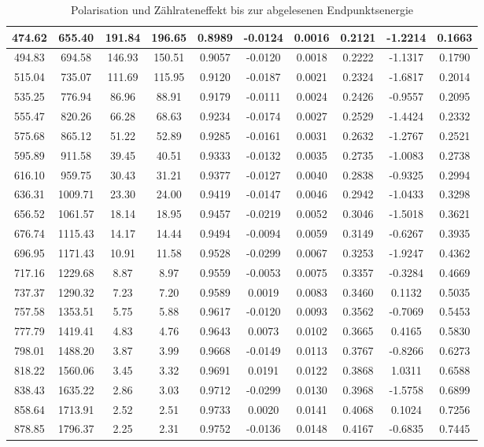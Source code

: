 \documentclass[twoside,colorback,accentcolor=tud4c,11pt]{tudreport}
\begin{document}
\begin{table}[H]
\begin{tabular}{|c|c|c|c|c|c|c|c|c|c|}
\hline
474.62 & 655.40 & 191.84 & 196.65 & 0.8989 & -0.0124 & 0.0016 & 0.2121 & -1.2214 & 0.1663 \\
\hline
494.83 & 694.58 & 146.93 & 150.51 & 0.9057 & -0.0120 & 0.0018 & 0.2222 & -1.1317 & 0.1790 \\
\hline
515.04 & 735.07 & 111.69 & 115.95 & 0.9120 & -0.0187 & 0.0021 & 0.2324 & -1.6817 & 0.2014 \\
\hline
535.25 & 776.94 & 86.96 & 88.91 & 0.9179 & -0.0111 & 0.0024 & 0.2426 & -0.9557 & 0.2095 \\
\hline
555.47 & 820.26 & 66.28 & 68.63 & 0.9234 & -0.0174 & 0.0027 & 0.2529 & -1.4424 & 0.2332 \\
\hline
575.68 & 865.12 & 51.22 & 52.89 & 0.9285 & -0.0161 & 0.0031 & 0.2632 & -1.2767 & 0.2521 \\
\hline
595.89 & 911.58 & 39.45 & 40.51 & 0.9333 & -0.0132 & 0.0035 & 0.2735 & -1.0083 & 0.2738 \\
\hline
616.10 & 959.75 & 30.43 & 31.21 & 0.9377 & -0.0127 & 0.0040 & 0.2838 & -0.9325 & 0.2994 \\
\hline
636.31 & 1009.71 & 23.30 & 24.00 & 0.9419 & -0.0147 & 0.0046 & 0.2942 & -1.0433 & 0.3298 \\
\hline
656.52 & 1061.57 & 18.14 & 18.95 & 0.9457 & -0.0219 & 0.0052 & 0.3046 & -1.5018 & 0.3621 \\
\hline
676.74 & 1115.43 & 14.17 & 14.44 & 0.9494 & -0.0094 & 0.0059 & 0.3149 & -0.6267 & 0.3935 \\
\hline
696.95 & 1171.43 & 10.91 & 11.58 & 0.9528 & -0.0299 & 0.0067 & 0.3253 & -1.9247 & 0.4362 \\
\hline
717.16 & 1229.68 & 8.87 & 8.97 & 0.9559 & -0.0053 & 0.0075 & 0.3357 & -0.3284 & 0.4669 \\
\hline
737.37 & 1290.32 & 7.23 & 7.20 & 0.9589 & 0.0019 & 0.0083 & 0.3460 & 0.1132 & 0.5035 \\
\hline
757.58 & 1353.51 & 5.75 & 5.88 & 0.9617 & -0.0120 & 0.0093 & 0.3562 & -0.7069 & 0.5453 \\
\hline
777.79 & 1419.41 & 4.83 & 4.76 & 0.9643 & 0.0073 & 0.0102 & 0.3665 & 0.4165 & 0.5830 \\
\hline
798.01 & 1488.20 & 3.87 & 3.99 & 0.9668 & -0.0149 & 0.0113 & 0.3767 & -0.8266 & 0.6273 \\
\hline
818.22 & 1560.06 & 3.45 & 3.32 & 0.9691 & 0.0191 & 0.0122 & 0.3868 & 1.0311 & 0.6588 \\
\hline
838.43 & 1635.22 & 2.86 & 3.03 & 0.9712 & -0.0299 & 0.0130 & 0.3968 & -1.5758 & 0.6899 \\
\hline
858.64 & 1713.91 & 2.52 & 2.51 & 0.9733 & 0.0020 & 0.0141 & 0.4068 & 0.1024 & 0.7256 \\
\hline
878.85 & 1796.37 & 2.25 & 2.31 & 0.9752 & -0.0136 & 0.0148 & 0.4167 & -0.6835 & 0.7445 \\
\hline
\end{tabular} 
\caption{Polarisation und Zählrateneffekt bis zur abgelesenen Endpunktsenergie}\label{tab:P}
\end{table}
\end{document}
